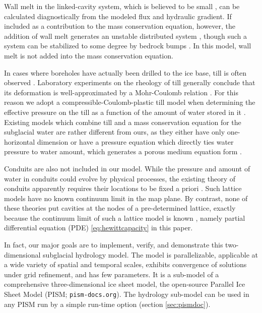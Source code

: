 \documentclass[gmd]{copernicus}   %
\begin{document}
Wall melt in the linked-cavity system, which is believed to be small \citep{Kamb1987}, can be calculated diagnostically from the modeled flux and hydraulic gradient.  If included as a contribution to the mass conservation equation, however, the addition of wall melt generates an unstable distributed system \citep{Walder1982}, though such a system can be stabilized to some degree by bedrock bumps \citep{CreytsSchoof2009}.  In this model, wall melt is not added into the mass conservation equation.

In cases where boreholes have actually been drilled to the ice base, till is often observed \citep{Hookeetal1997,Tulaczyketal2000,TrufferHarrisonEchelmeyer2000,TrufferHarrison2006}.  Laboratory experiments on the rheology of till \citep{Kamb1991,Hookeetal1997,Tulaczyketal2000,TrufferEchelmeyerHarrison2001} generally conclude that its deformation is well-approximated by a Mohr-Coulomb relation \citep{SchoofTill}.  For this reason we adopt a compressible-Coulomb-plastic till model when determining the effective pressure on the till as a function of the amount of water stored in it \citep{Tulaczyketal2000}.  Existing models which combine till and a mass conservation equation for the subglacial water are rather different from ours, as they either have only one-horizontal dimension \citep{vanderWeletal2013} or have a pressure equation which directly ties water pressure to water amount, which generates a porous medium equation form \citep{FlowersClarke2002_theory,deFleurianetal2014}.

Conduits are also not included in our model.  While the pressure and amount of water in conduits could evolve by physical processes, the existing theory of conduits apparently requires their locations to be fixed a priori \citep{Schoofmeltsupply,Hewitt2013,Werderetal2013}.  Such lattice models have no known continuum limit in the map plane.  By contrast, none of these theories put cavities at the nodes of a pre-determined lattice, exactly because the continuum limit of such a lattice model is known \citep{Hewitt2011}, namely partial differential equation (PDE) \eqref{eq:hewittcapacity} in this paper.

In fact, our major goals are to implement, verify, and demonstrate this two-dimensional subglacial hydrology model.  The model is parallelizable, applicable at a wide variety of spatial and temporal scales, exhibits convergence of solutions under grid refinement, and has few parameters.  It is a sub-model of a comprehensive three-dimensional ice sheet model, the open-source Parallel Ice Sheet Model (PISM; \texttt{pism-docs.org}).  The hydrology sub-model can be used in any PISM run by a simple run-time option (section \ref{sec:pismdoc}).
\end{document}
